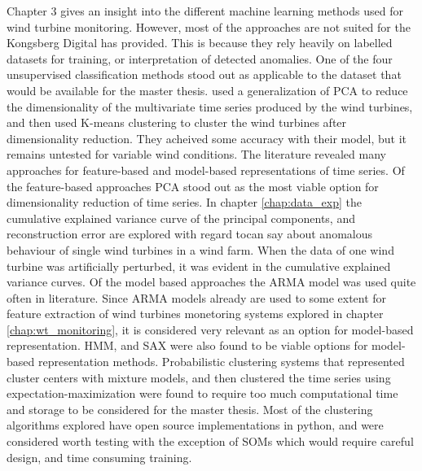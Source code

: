 Chapter 3 gives an insight into the different machine learning methods used for wind turbine monitoring. However, most of the approaches are not suited for the Kongsberg Digital has provided. 
This is because they rely heavily on labelled datasets for training, or interpretation of detected anomalies. 
One of the four unsupervised classification methods stood out as applicable to the dataset that would be available for the master thesis. \textcite{fault_detect_PARAFAC_k_means} used a generalization of PCA to reduce the dimensionality of the multivariate time series produced by the wind turbines, and then used K-means clustering to cluster the wind turbines after dimensionality reduction. They acheived some accuracy with their model, but it remains untested for variable wind conditions. 
The literature revealed many approaches for feature-based and model-based representations of time series. 
Of the feature-based approaches PCA stood out as the most viable option for dimensionality reduction of time series. 
In chapter \ref{chap:data_exp} the cumulative explained variance curve of the principal components, and reconstruction error are explored with regard tocan say about anomalous behaviour of single wind turbines in a wind farm. 
When the data of one wind turbine was artificially perturbed, it was evident in the cumulative explained variance curves. 
Of the model based approaches the ARMA model was used quite often in literature. Since ARMA models already are used to some extent for feature extraction of wind turbines monetoring systems explored in chapter \ref{chap:wt_monitoring}, it is considered very relevant as an option for model-based representation. 
HMM, and SAX were also found to be viable options for model-based representation methods.
Probabilistic clustering systems that represented cluster centers with mixture models, and then clustered the time series using expectation-maximization were found to require too much computational time and storage to be considered for the master thesis.
Most of the clustering algorithms explored have open source implementations in python, and were considered worth testing with the exception of SOMs which would require careful design, and time consuming training. 

